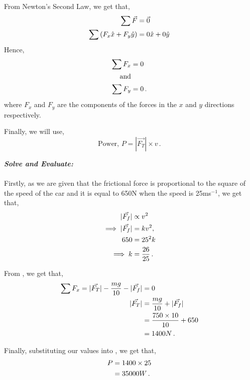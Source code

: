 \begin{subquestions}
From Newton's Second Law, we get that,
\begin{align}
	\sum \vec{F} & = \vec{0} \nonumber \\
	\sum \left(F_x \hat{x} + F_y \hat{y}\right) &= 0 \hat{x} + 0 \hat{y} 
\end{align}
Hence,
\begin{align}
	\sum F_x & = 0 \label{2009:q5:FxEqn1} \\
	\text{and} & \nonumber \\
	\sum F_y & = 0 \,.
\end{align}
where $F_x$ and $F_y$ are the components of the forces in the $x$ and $y$ directions respectively.

Finally, we will use,
\begin{equation}
	\text{Power, }P = |\vec{F_T}|\times v \label{2009:q5:PEqn1} \,.
\end{equation}




\textbf{\textit{Solve and Evaluate:}} \\ \\
Firstly, as we are given that the frictional force is proportional to the square of the speed of the car and it is equal to 650N when the speed is 25ms$^{-1}$, we get that,
\begin{align}
	|\vec{F_f}| & \propto v^2 \nonumber \\
	\implies |\vec{F_f}| & = kv^2, \nonumber \\
	650 & = 25^2k \nonumber \\
	\implies k & = \frac{26}{25} \,.
\end{align}

From , we get that,
\begin{align}
	\sum F_x = |\vec{F_T}|-\frac{mg}{10}-|\vec{F_f}| & = 0 \nonumber \\
	|\vec{F_T}| & = \frac{mg}{10}+|\vec{F_f}| \nonumber \\
	            & = \frac{750\times10}{10} +650 \nonumber \\
	            & = 1400N \,. \label{2009:q5:TracEqn1}
\end{align} 

Finally, substituting our values into , we get that,
\begin{align}
	P & = 1400 \times 25 \nonumber \\
	  & = 35000W \,.
\end{align}



\end{subquestions}
